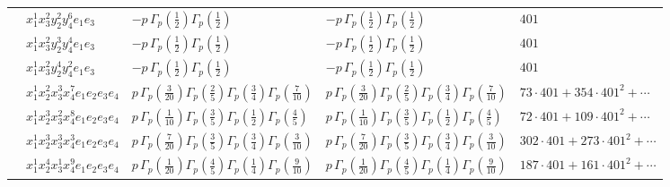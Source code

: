 \documentclass[11pt]{article}
\begin{document}
\begin{table}[ht]
{\begin{tabular}{@{}lllll@{}}
 & $x_{1}^{1} x_{3}^{2} y_{2}^{2} y_{4}^{6} e_{1} e_{3}$ & $- p \, \Gamma_p \left( \frac{1}{2} \right) \Gamma_p \left( \frac{1}{2} \right)$ & $- p \, \Gamma_p \left( \frac{1}{2} \right) \Gamma_p \left( \frac{1}{2} \right)$ & $401$ \\
 & $x_{1}^{1} x_{3}^{2} y_{2}^{3} y_{4}^{4} e_{1} e_{3}$ & $- p \, \Gamma_p \left( \frac{1}{2} \right) \Gamma_p \left( \frac{1}{2} \right)$ & $- p \, \Gamma_p \left( \frac{1}{2} \right) \Gamma_p \left( \frac{1}{2} \right)$ & $401$ \\
 & $x_{1}^{1} x_{3}^{2} y_{2}^{4} y_{4}^{2} e_{1} e_{3}$ & $- p \, \Gamma_p \left( \frac{1}{2} \right) \Gamma_p \left( \frac{1}{2} \right)$ & $- p \, \Gamma_p \left( \frac{1}{2} \right) \Gamma_p \left( \frac{1}{2} \right)$ & $401$ \\
 & $x_{1}^{1} x_{2}^{2} x_{3}^{3} x_{4}^{7}  e_{1} e_{2} e_{3} e_{4}$ & $p \, \Gamma_p \left( \frac{3}{20} \right) \Gamma_p \left( \frac{2}{5} \right) \Gamma_p \left( \frac{3}{4} \right) \Gamma_p \left( \frac{7}{10} \right)$ & $p \, \Gamma_p \left( \frac{3}{20} \right) \Gamma_p \left( \frac{2}{5} \right) \Gamma_p \left( \frac{3}{4} \right) \Gamma_p \left( \frac{7}{10} \right)$ & $73{\cdot}401{+}354{\cdot}401^{2}{+}\cdots$ \\
 & $x_{1}^{1} x_{2}^{3} x_{3}^{2} x_{4}^{8}  e_{1} e_{2} e_{3} e_{4}$ & $p \, \Gamma_p \left( \frac{1}{10} \right) \Gamma_p \left( \frac{3}{5} \right) \Gamma_p \left( \frac{1}{2} \right) \Gamma_p \left( \frac{4}{5} \right)$ & $p \, \Gamma_p \left( \frac{1}{10} \right) \Gamma_p \left( \frac{3}{5} \right) \Gamma_p \left( \frac{1}{2} \right) \Gamma_p \left( \frac{4}{5} \right)$ & $72{\cdot}401{+}109{\cdot}401^{2}{+}\cdots$ \\
 & $x_{1}^{1} x_{2}^{3} x_{3}^{3} x_{4}^{3}  e_{1} e_{2} e_{3} e_{4}$ & $p \, \Gamma_p \left( \frac{7}{20} \right) \Gamma_p \left( \frac{3}{5} \right) \Gamma_p \left( \frac{3}{4} \right) \Gamma_p \left( \frac{3}{10} \right)$ & $p \, \Gamma_p \left( \frac{7}{20} \right) \Gamma_p \left( \frac{3}{5} \right) \Gamma_p \left( \frac{3}{4} \right) \Gamma_p \left( \frac{3}{10} \right)$ & $302{\cdot}401{+}273{\cdot}401^{2}{+}\cdots$ \\
 & $x_{1}^{1} x_{2}^{4} x_{3}^{1} x_{4}^{9}  e_{1} e_{2} e_{3} e_{4}$ & $p \, \Gamma_p \left( \frac{1}{20} \right) \Gamma_p \left( \frac{4}{5} \right) \Gamma_p \left( \frac{1}{4} \right) \Gamma_p \left( \frac{9}{10} \right)$ & $p \, \Gamma_p \left( \frac{1}{20} \right) \Gamma_p \left( \frac{4}{5} \right) \Gamma_p \left( \frac{1}{4} \right) \Gamma_p \left( \frac{9}{10} \right)$ & $187{\cdot}401{+}161{\cdot}401^{2}{+}\cdots$ \\

\end{tabular}}
\end{table}
\end{document}

